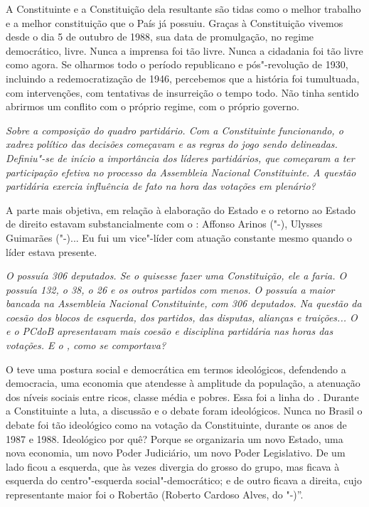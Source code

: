 A Constituinte e a Constituição dela resultante são tidas como o melhor
trabalho e a melhor constituição que o País já possuiu. Graças à
Constituição vivemos desde o dia 5 de outubro de 1988, sua data de
promulgação, no regime democrático, livre. Nunca a imprensa foi tão
livre. Nunca a cidadania foi tão livre como agora. Se olharmos todo o
período republicano e pós"-revolução de 1930, incluindo a
redemocratização de 1946, percebemos que a história foi tumultuada, com
intervenções, com tentativas de insurreição o tempo todo. Não tinha
sentido abrirmos um conflito com o próprio regime, com o próprio
governo.

\medskip

\noindent\emph{Sobre a composição do quadro partidário. Com a Constituinte
funcionando, o xadrez político das decisões começavam e as regras do
jogo sendo delineadas. Definiu"-se de início a importância dos líderes
partidários, que começaram a ter participação efetiva no processo da
Assembleia Nacional Constituinte. A questão partidária exercia
influência de fato na hora das votações em plenário?}

A parte mais objetiva, em relação à elaboração do
Estado e o retorno ao Estado de direito estavam substancialmente com o
: Affonso Arinos ("-), Ulysses Guimarães ("-)... Eu fui um
vice"-líder com atuação constante mesmo quando o líder estava presente.

\medskip

\noindent\emph{O  possuía 306 deputados. Se o  quisesse fazer uma
Constituição, ele a faria. O  possuía 132, o  38, o  26 e os
outros partidos com menos. O  possuía a maior bancada na Assembleia
Nacional Constituinte, com 306 deputados. Na questão da coesão dos
blocos de esquerda, dos partidos, das disputas, alianças e traições... O
 e o PCdoB apresentavam mais coesão e disciplina partidária nas horas
das votações. E o , como se comportava?}

O  teve uma postura social e democrática em termos
ideológicos, defendendo a democracia, uma economia que atendesse à
amplitude da população, a atenuação dos níveis sociais entre ricos,
classe média e pobres. Essa foi a linha do . Durante a Constituinte
a luta, a discussão e o debate foram ideológicos. Nunca no Brasil o
debate foi tão ideológico como na votação da Constituinte, durante os
anos de 1987 e 1988. Ideológico por quê? Porque se organizaria um novo
Estado, uma nova economia, um novo Poder Judiciário, um novo Poder
Legislativo. De um lado ficou a esquerda, que às vezes divergia do
grosso do grupo, mas ficava à esquerda do centro"-esquerda
social"-democrático; e de outro ficava a direita, cujo representante
maior foi o Robertão (Roberto Cardoso Alves, do "-)''.

